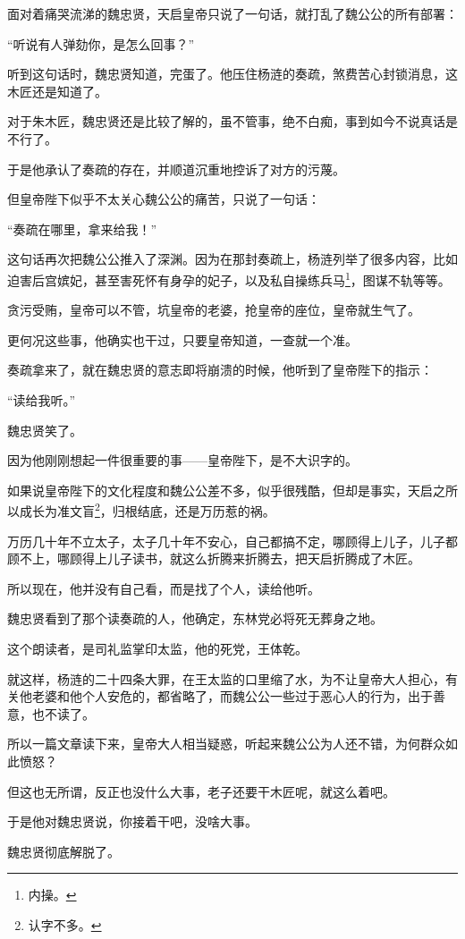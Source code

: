 \begin{multicols}{\theparacolNo}
面对着痛哭流涕的魏忠贤，天启皇帝只说了一句话，就打乱了魏公公的所有部署：

“听说有人弹劾你，是怎么回事？”

听到这句话时，魏忠贤知道，完蛋了。他压住杨涟的奏疏，煞费苦心封锁消息，这木匠还是知道了。

对于朱木匠，魏忠贤还是比较了解的，虽不管事，绝不白痴，事到如今不说真话是不行了。

于是他承认了奏疏的存在，并顺道沉重地控诉了对方的污蔑。

但皇帝陛下似乎不太关心魏公公的痛苦，只说了一句话：

“奏疏在哪里，拿来给我！”

这句话再次把魏公公推入了深渊。因为在那封奏疏上，杨涟列举了很多内容，比如迫害后宫嫔妃，甚至害死怀有身孕的妃子，以及私自操练兵马\footnote{内操。}，图谋不轨等等。

贪污受贿，皇帝可以不管，坑皇帝的老婆，抢皇帝的座位，皇帝就生气了。

更何况这些事，他确实也干过，只要皇帝知道，一查就一个准。

奏疏拿来了，就在魏忠贤的意志即将崩溃的时候，他听到了皇帝陛下的指示：

“读给我听。”

魏忠贤笑了。

因为他刚刚想起一件很重要的事——皇帝陛下，是不大识字的。

如果说皇帝陛下的文化程度和魏公公差不多，似乎很残酷，但却是事实，天启之所以成长为准文盲\footnote{认字不多。}，归根结底，还是万历惹的祸。

万历几十年不立太子，太子几十年不安心，自己都搞不定，哪顾得上儿子，儿子都顾不上，哪顾得上儿子读书，就这么折腾来折腾去，把天启折腾成了木匠。

所以现在，他并没有自己看，而是找了个人，读给他听。

魏忠贤看到了那个读奏疏的人，他确定，东林党必将死无葬身之地。

这个朗读者，是司礼监掌印太监，他的死党，王体乾。

就这样，杨涟的二十四条大罪，在王太监的口里缩了水，为不让皇帝大人担心，有关他老婆和他个人安危的，都省略了，而魏公公一些过于恶心人的行为，出于善意，也不读了。

所以一篇文章读下来，皇帝大人相当疑惑，听起来魏公公为人还不错，为何群众如此愤怒？

但这也无所谓，反正也没什么大事，老子还要干木匠呢，就这么着吧。

于是他对魏忠贤说，你接着干吧，没啥大事。

魏忠贤彻底解脱了。


\end{multicols}
